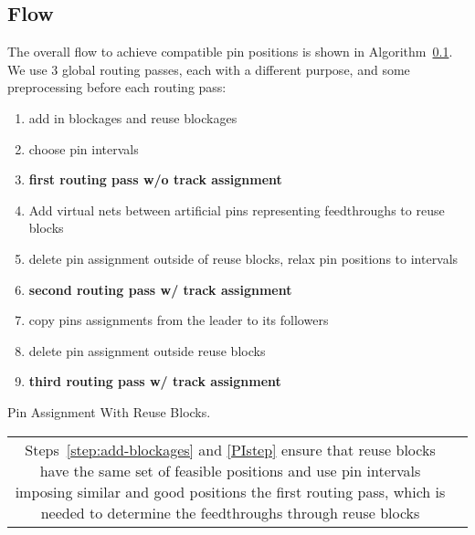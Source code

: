 \documentclass[a2paper]{bigsposter}
\begin{document}
\begin{blockrow}
\subsection{Flow}\label{sec:3pass}
The overall flow to achieve compatible pin positions is shown in Algorithm~\ref{sec:3pass}.
We use 3 global routing passes, each with a different purpose, and some preprocessing before each routing pass:
\begin{algorithm}[H]
	\begin{enumerate}
		\item add in blockages and reuse blockages \label{step:add-blockages}
		\item choose pin intervals  \label{PIstep}
		\item \textbf{first routing pass w/o track assignment} \label{step:pass1}
		\item Add virtual nets between artificial pins representing feedthroughs to reuse blocks \label{step:create-artificial-feedthroughs}
		\item delete pin assignment outside of reuse blocks, relax pin positions to intervals \label{step:relaxpositions}
		\item \textbf{second routing pass w/ track assignment}
		\item copy pins assignments from the leader to its followers \label{step:copy-pin-assignment}
		\item delete pin assignment outside reuse blocks
		\item \textbf{third routing pass w/ track assignment}
	\end{enumerate} %
	\caption{Pin Assignment With Reuse Blocks.}
	\label{alg:reuse-alg}
\end{algorithm}
\begin{tabular}{cc}
	\begin{minipage}{0.5\blockwidth}
	

		  Steps~\ref{step:add-blockages} and \ref{PIstep} ensure that reuse blocks have the same set of feasible positions and use pin intervals imposing  similar and good  positions the first routing pass, which is needed to determine the feedthroughs through reuse blocks
		   	\end{minipage}    &\begin{minipage}{0.49\blockwidth}
		  \centering\begin{tikzpicture}
	\def\nrows{4}
	\def\ncols{3}
	\def\rowheightu{0.7}
	\def\rowheightl{1.2}
	\def\corridorwidth{0.2}
	\def\reusewidth{2.0}
	\def\otherwidth{1.0}
	\def\uppersmallwidth{1.5}
	\def\sinkscale{0.3}
	\def\rootscale{0.4}
	

\end{tikzpicture}
\end{minipage}
\end{tabular}
\end{blockrow}
\end{document}
